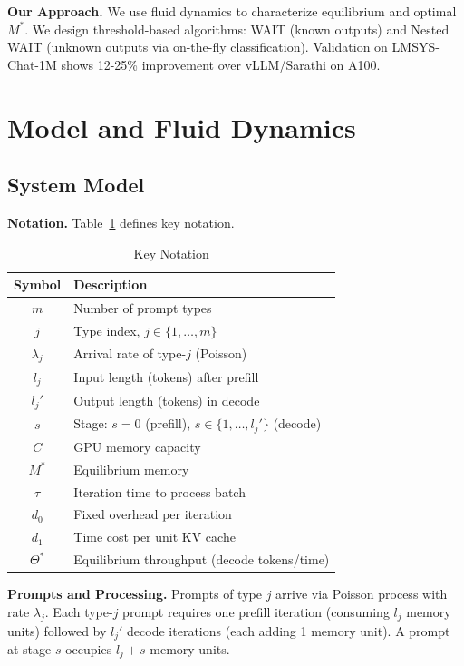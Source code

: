 \textbf{Our Approach.} We use fluid dynamics to characterize equilibrium and optimal $M^*$. We design threshold-based algorithms: WAIT (known outputs) and Nested WAIT (unknown outputs via on-the-fly classification). Validation on LMSYS-Chat-1M shows 12-25\% improvement over vLLM/Sarathi on A100.


\section{Model and Fluid Dynamics}

\subsection{System Model}

\textbf{Notation.} Table~\ref{tab:notation_iise} defines key notation.

\begin{table}[h]
\centering
\caption{Key Notation}
\label{tab:notation_iise}
\small
\begin{tabular}{cl}
\toprule
\textbf{Symbol} & \textbf{Description} \\
\midrule
$m$ & Number of prompt types \\
$j$ & Type index, $j \in \{1, \dots, m\}$ \\
$\lambda_j$ & Arrival rate of type-$j$ (Poisson) \\
$l_j$ & Input length (tokens) after prefill \\
$l_j'$ & Output length (tokens) in decode \\
$s$ & Stage: $s = 0$ (prefill), $s \in \{1, \dots, l_j'\}$ (decode) \\
$C$ & GPU memory capacity \\
$M^*$ & Equilibrium memory \\
$\tau$ & Iteration time to process batch \\
$d_0$ & Fixed overhead per iteration \\
$d_1$ & Time cost per unit KV cache \\
$\Theta^*$ & Equilibrium throughput (decode tokens/time) \\
\bottomrule
\end{tabular}
\end{table}

\textbf{Prompts and Processing.} Prompts of type $j$ arrive via Poisson process with rate $\lambda_j$. Each type-$j$ prompt requires one prefill iteration (consuming $l_j$ memory units) followed by $l_j'$ decode iterations (each adding 1 memory unit). A prompt at stage $s$ occupies $l_j + s$ memory units.

